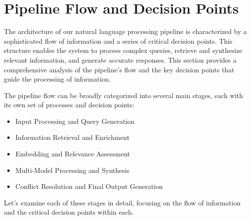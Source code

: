 \section{Pipeline Flow and Decision Points}\label{sec:pipeline-flow-and-decision-points}
The architecture of our natural language processing pipeline is characterized by a sophisticated flow of information and a series of critical decision points. This structure enables the system to process complex queries, retrieve and synthesize relevant information, and generate accurate responses. This section provides a comprehensive analysis of the pipeline's flow and the key decision points that guide the processing of information.

The pipeline flow can be broadly categorized into several main stages, each with its own set of processes and decision points:
\begin{itemize}
    \item Input Processing and Query Generation
    \item Information Retrieval and Enrichment
    \item Embedding and Relevance Assessment
    \item Multi-Model Processing and Synthesis
    \item Conflict Resolution and Final Output Generation
\end{itemize}
Let's examine each of these stages in detail, focusing on the flow of information and the critical decision points within each.
